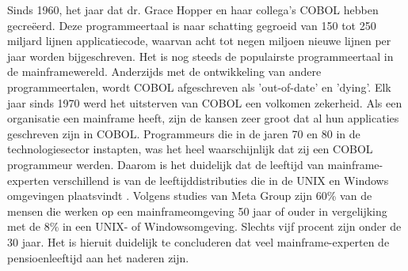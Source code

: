 Sinds 1960, het jaar dat dr. Grace Hopper en haar collega's COBOL hebben gecreëerd. Deze programmeertaal is naar schatting gegroeid van 150 tot 250 miljard lijnen applicatiecode, waarvan acht tot negen miljoen nieuwe lijnen per jaar worden bijgeschreven. Het is nog steeds de populairste programmeertaal in de mainframewereld. Anderzijds met de ontwikkeling van andere programmeertalen, wordt COBOL afgeschreven als 'out-of-date' en 'dying'. Elk jaar sinds 1970 werd het uitsterven van COBOL een volkomen zekerheid. Als een organisatie een mainframe heeft, zijn de kansen zeer groot dat al hun applicaties geschreven zijn in COBOL. Programmeurs die in de jaren 70 en 80 in de technologiesector instapten, was het heel waarschijnlijk dat zij een COBOL programmeur werden. Daarom is het duidelijk dat de leeftijd van mainframe-experten verschillend is van de leeftijddistributies die in de UNIX en Windows omgevingen plaatsvindt \autocite{McGirr}. Volgens studies van Meta Group zijn 60\% van de mensen die werken op een mainframeomgeving  50 jaar of ouder in vergelijking met de 8\% in een UNIX- of Windowsomgeving. Slechts vijf procent zijn onder de 30 jaar. Het is hieruit duidelijk te concluderen dat veel mainframe-experten de pensioenleeftijd aan het naderen zijn. 

